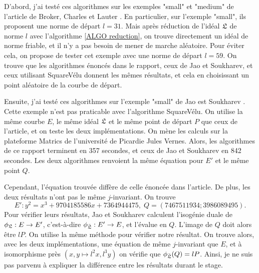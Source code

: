 D'abord, j'ai testé ces algorithmes sur les exemples "small" et "medium" de l'article de Broker, Charles et Lauter \cite{BrokerCharlesLauter}. En particulier, sur l'exemple "small", ils proposent une norme de départ $l = 31$. Mais après réduction de l'idéal $\mathfrak{L}$ de norme $l$ avec l'algorithme \ref{ALGO reduction}, on trouve directement un idéal de norme friable, et il n'y a pas besoin de mener de marche aléatoire. Pour éviter cela, on propose de tester cet exemple avec une norme de départ $l = 59$. On trouve que les algorithmes énoncés dans le rapport, ceux de Jao et Soukharev, et ceux utilisant SquareVélu donnent les mêmes résultats, et cela en choisissant un point aléatoire de la courbe de départ.    

Ensuite, j'ai testé ces algorithmes sur l'exemple "small" de Jao est Soukharev \cite{JaoSoukharev}. Cette exemple n'est pas praticable avec l'algorithme SquareVélu. On utilise la même courbe $E$, le même idéal $\mathfrak{L}$ et le même point de départ $P$ que ceux de l'article, et on teste les deux implémentations. On mène les calculs sur la plateforme Matrics de l'université de Picardie Jules Vernes. Alors, les algorithmes de ce rapport terminent en 357 secondes, et ceux de Jao et Soukharev en 842 secondes. Les deux algorithmes renvoient la même équation pour $E'$ et le même point $Q$. 

Cependant, l'équation trouvée diffère de celle énoncée dans l'article. De plus, les deux résultats n'ont pas le même $j$-invariant. On trouve
\begin{equation*}
	E' : y^2 = x^3 + 9704185586x + 7364944475,\;
	Q = (7467511934 ; 3986089495).
\end{equation*}
Pour vérifier leurs résultats, Jao et Soukharev calculent l'isogénie duale de $\phi_{\mathfrak{L}}:E\rightarrow E'$, c'est-à-dire $\phi_{\bar{\mathfrak{L}}} : E'\rightarrow E$, et l'évalue en $Q$. L'image de $Q$ doit alors être $lP$. On utilise la même méthode pour vérifier notre résultat. On trouve alors, avec les deux implémentations, une équation de même $j$-invariant que $E$, et à isomorphisme près $(x,y\mapsto l^2x, l^3y)$ on vérifie que $\phi_{\bar{\mathfrak{L}}}(Q) = lP$. Ainsi, je ne suis pas parvenu à expliquer la différence entre les résultats durant le stage.  